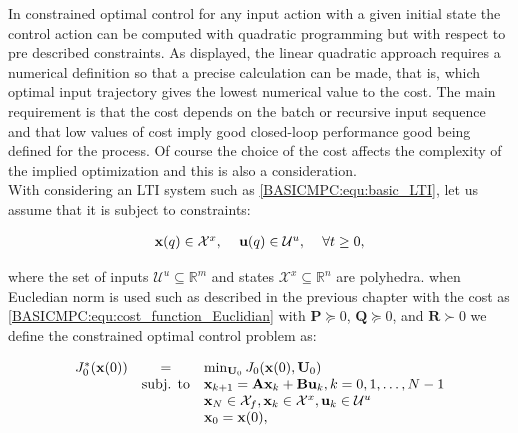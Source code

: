 	
	\label{BASICCSR:sec:OptimalControl}
	
	In constrained optimal control for any input action with a given initial state the control action can be computed with quadratic programming but with respect to pre described constraints. As displayed, the linear quadratic approach requires a numerical definition so that a precise calculation can be made, that is, which optimal input trajectory gives the lowest numerical value to the cost. The main requirement is that the cost depends on the batch or recursive input sequence and that low values of cost imply good closed-loop performance good being defined for the process. Of course the choice of the cost affects the complexity of the implied optimization and this is also a consideration.\\
With considering an LTI system such as \ref{BASICMPC:equ:basic_LTI}, let us assume that it is subject to constraints:

\begin{equation}
        \begin{array}{rcl}
            \textbf{x}(q)\in\mathcal{X}^x,&\textnormal{ }\textbf{u}(q)\in\mathcal{U}^u,&\textnormal{ }\forall t\geq0,\\
        \end{array}
        \label{BASICMPC:equ:basic_LTI_constrained}
    \end{equation}

    where the set of inputs $\mathcal{U}^u\subseteq\mathbb{R}^m$ and states $\mathcal{X}^x\subseteq\mathbb{R}^n$ are polyhedra. when Eucledian norm is used such as described in the previous chapter with the cost as \ref{BASICMPC:equ:cost_function_Euclidian} with $\textbf{P}\succeq0$, $\textbf{Q}\succeq0$, and $\textbf{R}\succ0$ we define the constrained optimal control problem as:

    \begin{equation}
        \begin{array}{rcl}
            J^*_0(\textbf{x}(0))&=&\min_{\textbf{U}_0}J_0(\textbf{x}(0),\textbf{U}_0)\\
            &\textnormal{subj. to}&\textbf{x}_{k+1}=\textbf{Ax}_{k}+\textbf{Bu}_{k},k=0,1,\dots,N-1\\
            &&\textbf{x}_N\in\mathcal{X}_f,\textbf{x}_k\in\mathcal{X}^x,\textbf{u}_k\in\mathcal{U}^u\\
            &&\textbf{x}_0=\textbf{x}(0),
        \end{array}
        \label{BASICMPC:equ:constrained_optimal_control_problem}
    \end{equation}

